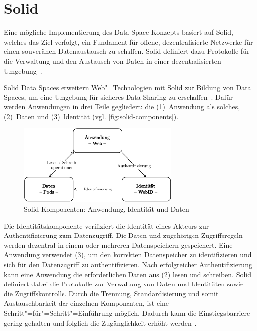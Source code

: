 
\section{Solid}

Eine mögliche Implementierung des Data Space Konzepts basiert auf Solid, welches das Ziel verfolgt, ein Fundament für offene, dezentralisierte Netzwerke für einen souveränen Datenaustausch zu schaffen.
Solid definiert dazu Protokolle für die Verwaltung und den Austausch von Daten in einer dezentralisierten Umgebung~\cite{mecklerWebLinkedData2023}.

Solid Data Spaces erweitern Web"=Technologien mit Solid zur Bildung von Data Spaces, um eine Umgebung für sicheres Data Sharing zu erschaffen~\cite{mecklerWebLinkedData2023}.
Dafür werden Anwendungen in drei Teile gegliedert: die (1)~Anwendung als solches, (2)~Daten und (3)~Identität (vgl. \autoref{fig:solid-components}).

\begin{figure}[t]
    \includegraphics[width=0.7\textwidth]{./assets/solid_triangle.drawio.pdf}
    \caption{Solid-Komponenten: Anwendung, Identität und Daten}
    \label{fig:solid-components}
\end{figure}

Die Identitätskomponente verifiziert die Identität eines Akteurs zur Authentifizierung zum Datenzugriff.
Die Daten und zugehörigen Zugriffsregeln werden dezentral in einem oder mehreren Datenspeichern gespeichert.
Eine Anwendung verwendet (3), um den korrekten Datenspeicher zu identifizieren und sich für den Datenzugriff zu authentifizieren.
Nach erfolgreicher Authentifizierung kann eine Anwendung die erforderlichen Daten aus (2) lesen und schreiben.
Solid definiert dabei die Protokolle zur Verwaltung von Daten und Identitäten sowie die Zugriffskontrolle.
Durch die Trennung, Standardisierung und somit Austauschbarkeit der einzelnen Komponenten, ist eine Schritt"=für"=Schritt"=Einführung möglich.
Dadurch kann die Einstiegsbarriere gering gehalten und folglich die Zugänglichkeit erhöht werden~\cite{mecklerWebLinkedData2023}.


